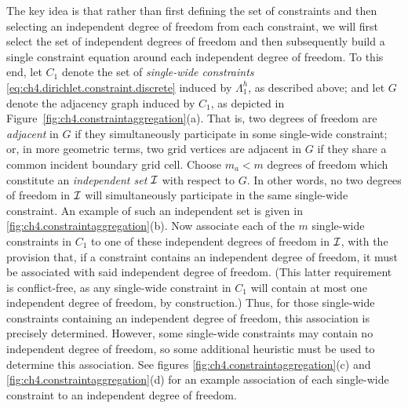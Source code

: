 The key idea is that rather than first defining the set of constraints and then selecting an independent degree of freedom from each constraint, we will first select the set of independent degrees of freedom and then subsequently build a single constraint equation around each independent degree of freedom. To this end, let $C_1$ denote the set of \emph{single-wide constraints} \eqref{eq:ch4.dirichlet.constraint.discrete} induced by $\Lambda^h_1$, as described above; and let $G$ denote the adjacency graph induced by $C_1$, as depicted in Figure~\ref{fig:ch4.constraintaggregation}(a). That is, two degrees of freedom are \emph{adjacent} in $G$ if they simultaneously participate in some single-wide constraint; or, in more geometric terms, two grid vertices are adjacent in $G$ if they share a common incident boundary grid cell. Choose $m_a < m$ degrees of freedom which constitute an \emph{independent set} $\mathcal{I}$ with respect to $G$. In other words, no two degrees of freedom in $\mathcal{I}$ will simultaneously participate in the same single-wide constraint. An example of such an independent set is given in \ref{fig:ch4.constraintaggregation}(b). Now associate each of the $m$ single-wide constraints in $C_1$ to one of these independent degrees of freedom in $\mathcal{I}$, with the provision that, if a constraint contains an independent degree of freedom, it must be associated with said independent degree of freedom. (This latter requirement is conflict-free, as any single-wide constraint in $C_1$ will contain at most one independent degree of freedom, by construction.) Thus, for those single-wide constraints containing an independent degree of freedom, this association is precisely determined. However, some single-wide constraints may contain no independent degree of freedom, so some additional heuristic must be used to determine this association. See figures \ref{fig:ch4.constraintaggregation}(c) and \ref{fig:ch4.constraintaggregation}(d) for an example association of each single-wide constraint to an independent degree of freedom.

